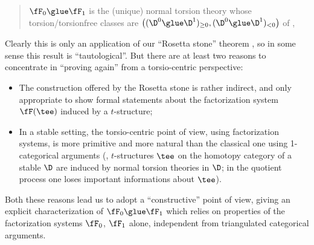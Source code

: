 \begin{quote}
$\fF_0\glue \fF_1$ is the (unique) normal torsion theory whose torsion/torsionfree classes are $\big((\D^0\glue \D^1)_{\ge 0},(\D^0\glue \D^1)_{<0}\big)$ of ,
\end{quote}
Clearly this is only an application of our ``Rosetta stone'' theorem , so in some sense this result is ``tautological''. But there are at least two reasons to concentrate in ``proving again''  from a torsio-centric perspective:
\begin{itemize}
\item The construction offered by the Rosetta stone is rather indirect, and only appropriate to show formal statements about the factorization system $\fF(\tee)$ induced by a $t$-structure;
\item In a stable setting, the torsio-centric point of view, using factorization systems, is more primitive and more natural than the classical one using 1-categorical arguments (\ie, $t$-structures $\tee$ on the homotopy category of a stable $\D$ are induced by normal torsion theories in $\D$; in the quotient process one loses important informations about $\tee$).
\end{itemize}
Both these reasons lead us to adopt a ``constructive'' point of view, giving an explicit characterization of $\fF_0\glue \fF_1$ which relies on properties of the factorization systems $\fF_0$, $\fF_1$ alone, independent from triangulated categorical arguments. 

